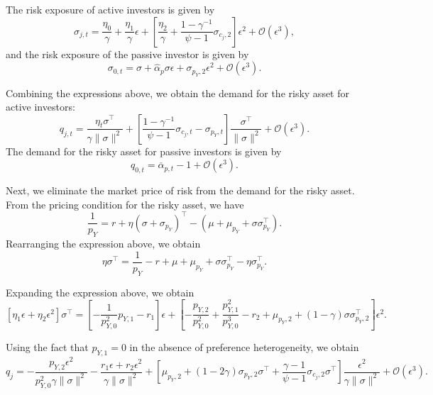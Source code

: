 The risk exposure of active investors is given by
\begin{equation}
    \sigma_{j,t} = \frac{\eta_0}{\gamma} + \frac{\eta_1}{\gamma} \epsilon + \left[\frac{\eta_2}{\gamma} + \frac{1-\gamma^{-1}}{\psi-1} \sigma_{c_j,2}\right] \epsilon^2 + \mathcal{O}(\epsilon^3),
\end{equation}
and the risk exposure of the passive investor is given by
\begin{equation}
    \sigma_{0,t} = \sigma + \hat{\alpha}_p \sigma \epsilon + \sigma_{p_Y,2} \epsilon^2 + \mathcal{O}(\epsilon^3).
\end{equation}

Combining the expressions above, we obtain the demand for the risky asset for active investors:
\begin{equation}
    q_{j,t} = \frac{\eta_t \sigma^\top}{\gamma \|\sigma\|^2} + \left[\frac{1-\gamma^{-1}}{\psi-1} \sigma_{c_j,t} - \sigma_{p_Y,t} \right] \frac{\sigma^\top}{\|\sigma\|^2} + \mathcal{O}(\epsilon^3).
\end{equation}
The demand for the risky asset for passive investors is given by
\begin{equation}
    q_{0,t} = \overline{\alpha}_{p,t} - 1 + \mathcal{O}(\epsilon^3).
\end{equation}

Next, we eliminate the market price of risk from the demand for the risky asset. 
From the pricing condition for the risky asset, we have
\begin{equation}
    \frac{1}{p_Y} = r + \eta (\sigma + \sigma_{p_Y})^\top - \left(\mu + \mu_{p_Y} + \sigma \sigma_{p_Y}^\top\right).        
\end{equation}
Rearranging the expression above, we obtain
\begin{equation}
    \eta \sigma^\top = \frac{1}{p_Y} - r + \mu + \mu_{p_Y} + \sigma \sigma_{p_Y}^\top - \eta \sigma_{p_Y}^\top.
\end{equation}

Expanding the expression above, we obtain
\begin{equation}
    \left[\eta_1\epsilon + \eta_2\epsilon^2 \right] \sigma^\top = \left[-\frac{1}{p_{Y,0}^2}p_{Y,1} - r_1\right]\epsilon + \left[- \frac{p_{Y,2}}{p_{Y,0}^2} + \frac{p_{Y,1}^2}{p_{Y,0}^3} -r_2+ \mu_{p_Y,2} +(1-\gamma) \sigma \sigma_{p_Y,2}^\top \right]\epsilon^2.
\end{equation}

Using the fact that $p_{Y,1} =0$ in the absence of preference heterogeneity, we obtain
\begin{equation}
    q_{j} = -\frac{p_{Y,2}\epsilon^2}{p_{Y,0}^2 \gamma \|\sigma\|^2} - \frac{r_1\epsilon + r_2\epsilon^2}{\gamma \|\sigma\|^2} + \left[ \mu_{p_Y,2} +(1-2\gamma) \sigma_{p_Y,2}\sigma^\top + \frac{\gamma-1}{\psi-1} \sigma_{c_j,2} \sigma^\top\right]\frac{\epsilon^2}{\gamma\|\sigma\|^2} + \mathcal{O}(\epsilon^3).
\end{equation}

